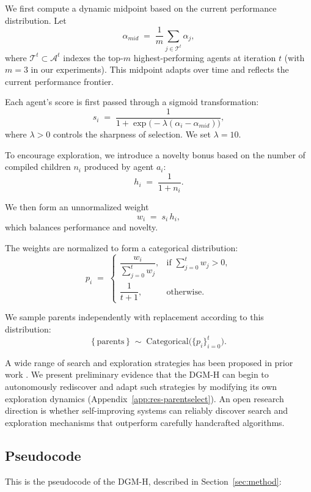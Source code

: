 We first compute a dynamic midpoint based on the current performance distribution. Let
\[
\alpha_{mid} \;=\; \frac{1}{m}\sum_{j \in \mathcal{T}^t} \alpha_j,
\]
where $\mathcal{T}^t \subset \mathcal{A}^t$ indexes the top-$m$ highest-performing agents at iteration $t$ (with $m=3$ in our experiments).
This midpoint adapts over time and reflects the current performance frontier.

Each agent's score is first passed through a sigmoid transformation:
\[
s_i \;=\; \frac{1}{1 + \exp\!\bigl(-\lambda(\alpha_i - \alpha_{mid})\bigr)},
\]
where $\lambda > 0$ controls the sharpness of selection. We set $\lambda = 10$.

To encourage exploration, we introduce a novelty bonus based on the number of compiled children $n_i$ produced by agent $a_i$:
\[
h_i \;=\; \frac{1}{1 + n_i}.
\]

We then form an unnormalized weight
\[
w_i \;=\; s_i \, h_i,
\]
which balances performance and novelty.

The weights are normalized to form a categorical distribution:
\[
p_i \;=\;
\begin{cases}
\dfrac{w_i}{\sum_{j=0}^t w_j}, & \text{if } \sum_{j=0}^t w_j > 0, \\[10pt]
\dfrac{1}{t+1}, & \text{otherwise}.
\end{cases}
\]

We sample parents independently with replacement according to this distribution:
\[
\{\,\text{parents}\,\}
\;\sim\;
\mathrm{Categorical}\bigl(\{p_i\}_{i=0}^t\bigr).
\]

A wide range of search and exploration strategies has been proposed in prior work \citep{coulom2006efficient, silver2016mastering, herr2025llm, wang2025huxley, weng2026group}. We present preliminary evidence that the DGM-H can begin to autonomously rediscover and adapt such strategies by modifying its own exploration dynamics (Appendix~\ref{app:res-parentselect}). An open research direction is whether self-improving systems can reliably discover search and exploration mechanisms that outperform carefully handcrafted algorithms.

\subsection{Pseudocode}
\label{app:pseudocode}

This is the pseudocode of the DGM-H, described in Section~\ref{sec:method}:

